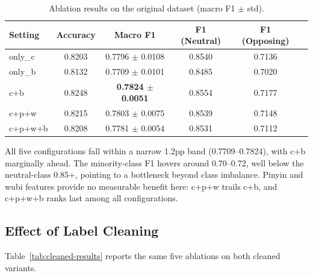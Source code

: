 ﻿\documentclass[12pt]{article}
\begin{document}
\begin{table}[htbp]
\centering
\caption{Ablation results on the original dataset (macro F1 $\pm$ std).}
\label{tab:original-results}
\begin{tabular}{lccccc}
\toprule
Setting & Accuracy & Macro F1 & F1 (Neutral) & F1 (Opposing) \\
\midrule
only\_c   & 0.8203 & 0.7796 $\pm$ 0.0108 & 0.8540 & 0.7136 \\
only\_b   & 0.8132 & 0.7709 $\pm$ 0.0101 & 0.8485 & 0.7020 \\
c+b       & 0.8248 & \textbf{0.7824 $\pm$ 0.0051} & 0.8554 & 0.7177 \\
c+p+w     & 0.8215 & 0.7803 $\pm$ 0.0075 & 0.8539 & 0.7148 \\
c+p+w+b   & 0.8208 & 0.7781 $\pm$ 0.0054 & 0.8531 & 0.7112 \\
\bottomrule
\end{tabular}
\end{table}

All five configurations fall within a narrow 1.2pp band (0.7709--0.7824), with c+b marginally ahead. The minority-class F1 hovers around 0.70--0.72, well below the neutral-class 0.85+, pointing to a bottleneck beyond class imbalance. Pinyin and wubi features provide no measurable benefit here: c+p+w trails c+b, and c+p+w+b ranks last among all configurations.

\subsection{Effect of Label Cleaning}

Table~\ref{tab:cleaned-results} reports the same five ablations on both cleaned variants.
\end{document}
